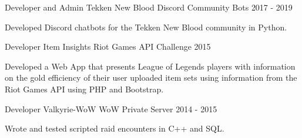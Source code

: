 

\begin{cventries}

  \cventry
    {Developer and Admin} %
    {Tekken New Blood} %
    {Discord Community Bots} %
    {2017 - 2019} %
    {
      \begin{cvitems} %
        \item {Developed Discord chatbots for the Tekken New Blood community in Python.}
      \end{cvitems}
    }
  \cventry
    {Developer} %
    {Item Insights} %
    {Riot Games API Challenge} %
    {2015} %
    {
      \begin{cvitems} %
        \item {Developed a Web App that presents League of Legends players with information on the gold efficiency of their user uploaded item sets using information from the Riot Games API using PHP and Bootstrap.}
      \end{cvitems}
    }

  \cventry
    {Developer} %
    {Valkyrie-WoW} %
    {WoW Private Server} %
    {2014 - 2015} %
    {
      \begin{cvitems} %
        \item {Wrote and tested scripted raid encounters in C++ and SQL.}
      \end{cvitems}
    }

\end{cventries}
